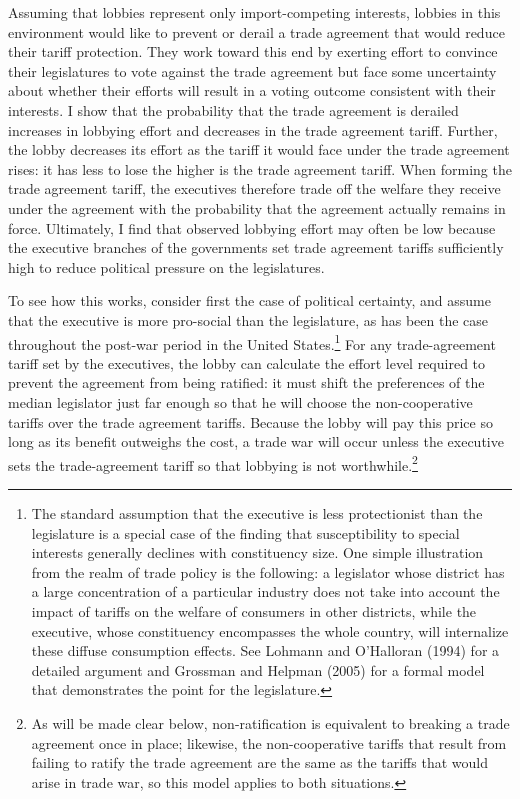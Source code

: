 \documentclass[10pt]{article}
\begin{document}
Assuming that lobbies represent only import-competing interests, lobbies in this environment would like to prevent or derail a trade agreement that would reduce their tariff protection. They work toward this end by exerting effort to convince their legislatures to vote against the trade agreement but face some uncertainty about whether their efforts will result in a voting outcome consistent with their interests. I show that the probability that the trade agreement is derailed increases in lobbying effort and decreases in the trade agreement tariff. Further, the lobby decreases its effort as the tariff it would face under the trade agreement rises: it has less to lose the higher is the trade agreement tariff. When forming the trade agreement tariff, the executives therefore trade off the welfare they receive under the agreement with the probability that the agreement actually remains in force. Ultimately, I find that observed lobbying effort may often be low because the executive branches of the governments set trade agreement tariffs sufficiently high to reduce political pressure on the legislatures.

To see how this works, consider first the case of political certainty, and assume that the executive is more pro-social than the legislature, as has been the case throughout the post-war period in the United States.\footnote{The standard assumption that the executive is less protectionist than the legislature is a special case of the finding that susceptibility to special interests generally declines with constituency size. One simple illustration from the realm of trade policy is the following: a legislator whose district has a large concentration of a particular industry does not take into account the impact of tariffs on the welfare of consumers in other districts, while the executive, whose constituency encompasses the whole country, will internalize these diffuse consumption effects. See Lohmann and O'Halloran (1994) for a detailed argument and Grossman and Helpman (2005) for a formal model that demonstrates the point for the legislature.\label{fn:ga_l_e}} For any trade-agreement tariff set by the executives, the lobby can calculate the effort level required to prevent the agreement from being ratified: it must shift the preferences of the median legislator just far enough so that he will choose the non-cooperative tariffs over the trade agreement tariffs. Because the lobby will pay this price so long as its benefit outweighs the cost, a trade war will occur unless the executive sets the trade-agreement tariff so that lobbying is not worthwhile.\footnote{As will be made clear below, non-ratification is equivalent to breaking a trade agreement once in place; likewise, the non-cooperative tariffs that result from failing to ratify the trade agreement are the same as the tariffs that would arise in trade war, so this model applies to both situations.}
\end{document}
